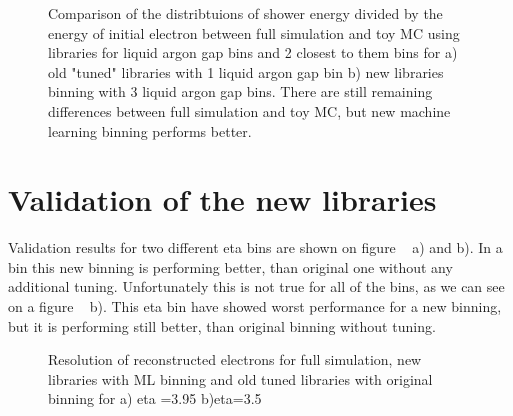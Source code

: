 \begin{figure}[!tbp]
\begin{minipage}[h]{0.49\linewidth}
\end{minipage}
\hfill
\begin{minipage}[h]{0.49\linewidth}
\end{minipage}
\caption{Comparison of the distribtuions of shower energy divided by  the energy of initial electron between full simulation and toy MC using libraries for liquid argon gap bins and 2 closest to them bins for a) old "tuned" libraries with 1 liquid argon gap bin  b) new libraries binning with 3 liquid argon gap bins. There are still remaining differences between full simulation and toy MC, but new machine learning binning performs better.}
\label{fig:Interpret}
\end{figure}


\section{Validation of the new libraries}\label{sec:FSValidation}


Validation results for two different eta bins are shown on figure ~ a) and b). In a bin this new binning is performing better, than original one without any additional tuning. Unfortunately this is not true for all of the bins, as we can see on a figure ~ b). This eta bin have showed worst performance for a new binning, but it is performing still better, than original binning without tuning.

\begin{figure}[!tbp]
\begin{minipage}[h]{0.49\linewidth}
\end{minipage}
\hfill
\begin{minipage}[h]{0.49\linewidth}
\end{minipage}
\caption{Resolution of reconstructed electrons for full simulation, new libraries with ML binning and old tuned libraries with original binning for a) eta =3.95 b)eta=3.5 }
\label{fig:Reso}
\end{figure}

